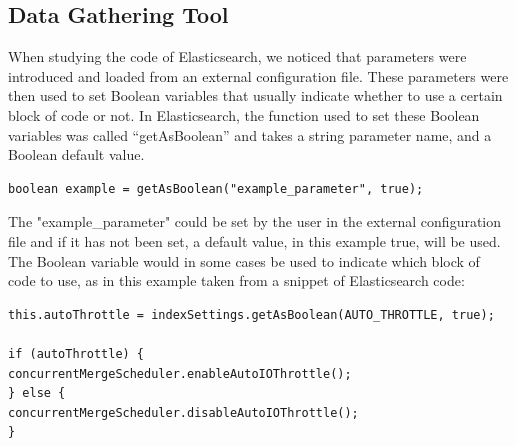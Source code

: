 \subsection{Data Gathering Tool}
When studying the code of Elasticsearch, we noticed that parameters were introduced and loaded from an external configuration file. These parameters were then used to set Boolean variables that usually indicate whether to use a certain block of code or not. In Elasticsearch, the function used to set these Boolean variables was called “getAsBoolean” and takes a string parameter name, and a Boolean default value.\\
\lstset{language=Java,numbers=left,xleftmargin=2em,frame=single,framexleftmargin=1.5em}
\begin{lstlisting}[frame=single,breaklines=true,tabsize=2]
boolean example = getAsBoolean("example_parameter", true);
\end{lstlisting}

The "example\_parameter" could be set by the user in the external configuration file and if it has not been set, a default value, in this example true, will be used. The Boolean variable would in some cases be used to indicate which block of code to use, as in this example taken from a snippet of Elasticsearch code:\\
\lstset{language=Java,numbers=left,xleftmargin=2em,frame=single,framexleftmargin=1.5em}
\begin{lstlisting}[frame=single,breaklines=true,tabsize=2]
this.autoThrottle = indexSettings.getAsBoolean(AUTO_THROTTLE, true);

if (autoThrottle) {
concurrentMergeScheduler.enableAutoIOThrottle();
} else {
concurrentMergeScheduler.disableAutoIOThrottle();
}
\end{lstlisting}


